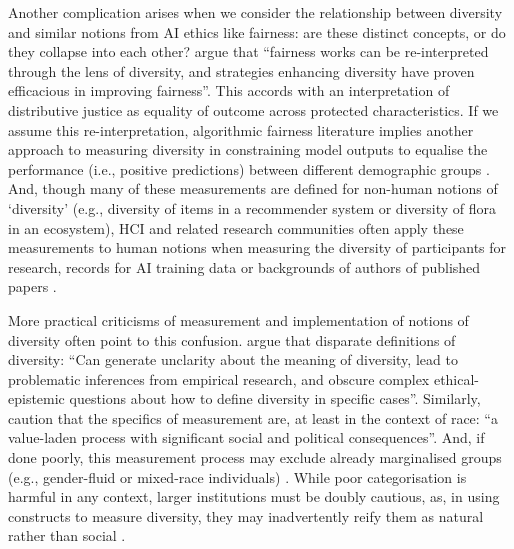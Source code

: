 Another complication arises when we consider the relationship between diversity and similar notions from AI ethics like fairness: are these distinct concepts, or do they collapse into each other? \textcite{zhao2023fairness} argue that ``fairness works can be re-interpreted through the lens of diversity, and strategies enhancing diversity have proven efficacious in improving fairness''. This accords with an interpretation of distributive justice as equality of outcome across protected characteristics. If we assume this re-interpretation, algorithmic fairness literature implies another approach to measuring diversity in constraining model outputs to equalise the performance (i.e., positive predictions) between different demographic groups \cite{barocas2023fairness}. And, though many of these measurements are defined for non-human notions of `diversity' (e.g., diversity of items in a recommender system or diversity of flora in an ecosystem), HCI and related research communities often apply these measurements to human notions when measuring the diversity of participants for research, records for AI training data or backgrounds of authors of published papers \cite{linxen2021weird,himmelsbach2019we,zhao2024position,rojas2022dollar,acuna2021ai}. 

More practical criticisms of measurement and implementation of notions of diversity often point to this confusion. \textcite{steel_multiple_2018} argue that disparate definitions of diversity: ``Can generate unclarity about the meaning of diversity, lead to problematic inferences from empirical research, and obscure complex ethical-epistemic questions about how to define diversity in specific cases''. Similarly, \textcite{abdu2023empirical} caution that the specifics of measurement are, at least in the context of race: ``a value-laden process with significant social and political consequences''. And, if done poorly, this measurement process may exclude already marginalised groups (e.g., gender-fluid or mixed-race individuals) \cite{scheuerman2019computers}. While poor categorisation is harmful in any context, larger institutions must be doubly cautious, as, in using constructs to measure diversity, they may inadvertently reify them as natural rather than social \cite{scheuerman2021auto}. 

